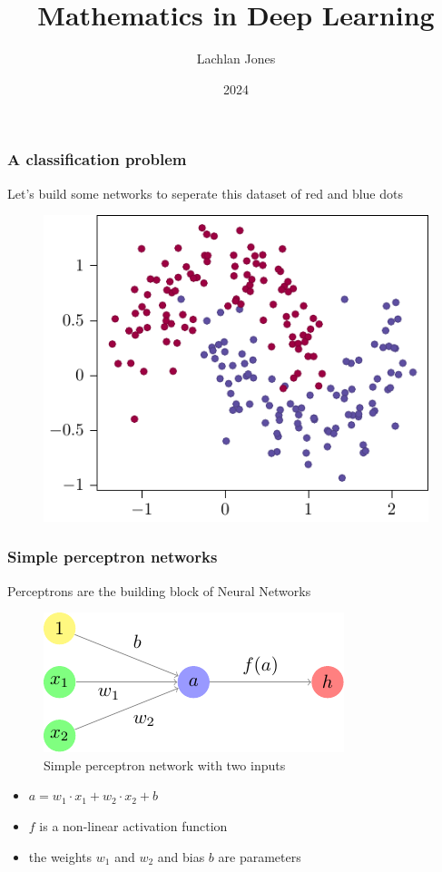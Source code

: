 \documentclass{beamer}
\title{Mathematics in Deep Learning}
\author{Lachlan Jones}
\institute{Math199}
\date{2024}
\begin{document}
\frame{\titlepage}

\begin{frame}
    \frametitle{A classification problem}
    Let's build some networks to seperate this dataset of red and blue dots
    \begin{figure}
        \centering
        \includegraphics{./figures/moons/main.pdf}
    \end{figure}
\end{frame}

\begin{frame}
    \frametitle{Simple perceptron networks}
    Perceptrons are the building block of Neural Networks
    \begin{figure}
        \centering
        \includegraphics{./figures/simple-perceptron/main.pdf}
        \caption{Simple perceptron network with two inputs}
    \end{figure} \pause
    \begin{itemize}
        \item \(a = w_1 \cdot x_1 + w_2 \cdot x_2 + b\) \pause
        \item \(f\) is a \alert{non-linear activation function} \pause
        \item the weights \(w_1\) and \(w_2\) and bias \(b\) are \alert{parameters}
    \end{itemize}
\end{frame}
\end{document}
